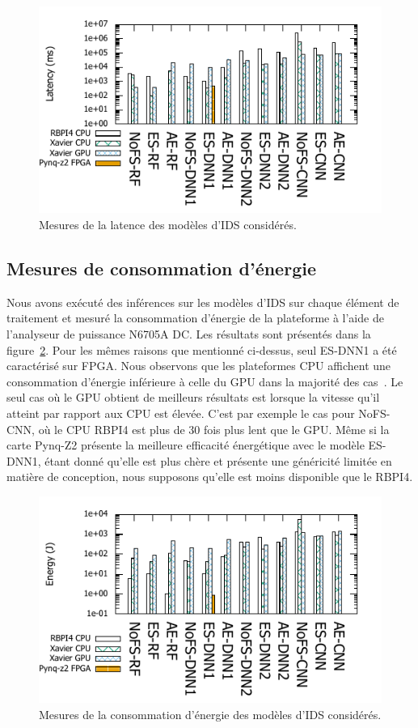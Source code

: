 {\begin{figure}
    \centering
    \includegraphics[width=0.6\columnwidth]{5_Chapitre5/figures/latency_bar.pdf}
    \caption{Mesures de la latence des modèles d'IDS considérés.}
    \label{figure:herocache-performance}
\end{figure}


\subsection{Mesures de consommation d'énergie}

Nous avons exécuté des inférences sur les modèles d'IDS sur chaque élément de traitement et mesuré la consommation d'énergie de la plateforme à l'aide de l'analyseur de puissance N6705A DC. Les résultats sont présentés dans la figure~\ref{figure:herocache-energy}. Pour les mêmes raisons que mentionné ci-dessus, seul ES-DNN1 a été caractérisé sur FPGA. Nous observons que les plateformes CPU affichent une consommation d'énergie inférieure à celle du GPU dans la majorité des cas~\cite{slimani:hal-04159551, SLIMANI2024}. Le seul cas où le GPU obtient de meilleurs résultats est lorsque la vitesse qu'il atteint par rapport aux CPU est élevée. C'est par exemple le cas pour NoFS-CNN, où le CPU RBPI4 est plus de 30 fois plus lent que le GPU. Même si la carte Pynq-Z2 présente la meilleure efficacité énergétique avec le modèle ES-DNN1, étant donné qu'elle est plus chère et présente une généricité limitée en matière de conception, nous supposons qu'elle est moins disponible que le RBPI4.

\begin{figure}
    \centering
    \includegraphics[width=0.6\columnwidth]{5_Chapitre5/figures/energy_bar.pdf}
    \caption{Mesures de la consommation d'énergie des modèles d'IDS considérés.}
    \label{figure:herocache-energy}
\end{figure}

}
